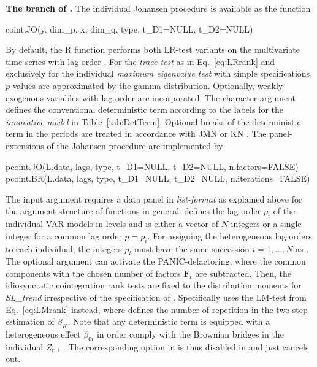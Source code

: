\textbf{The branch of \citeauthor{Johansen1996}.} The individual Johansen procedure is available as the function
\begin{CodeChunk}
\begin{CodeInput}
coint.JO(y, dim_p, x, dim_q, type, t_D1=NULL, t_D2=NULL)
\end{CodeInput}
\end{CodeChunk}
By default, the \textsf{R} function performs both LR-test variants on the  multivariate time series  with lag order . For the \textit{trace test} as in Eq.~\eqref{eq:LRrank} and exclusively for the individual \textit{maximum eigenvalue test} with simple specifications, $p$-values are approximated by the gamma distribution. Optionally, weakly exogenous variables  with lag order  are incorporated. The character argument  defines the conventional deterministic term according to the labels for the \textit{innovative model} in Table~\ref{tab:DetTerm}. Optional breaks of the deterministic term in the periods  are treated in accordance with JMN \citeyearpar{JohansenEtAl2000} or KN \citeyearpar{KuritaNielsen2019}. The panel-extensions of the Johansen procedure are implemented by
\begin{CodeChunk}
\begin{CodeInput}
pcoint.JO(L.data, lags, type, t_D1=NULL, t_D2=NULL, n.factors=FALSE)
pcoint.BR(L.data, lags, type, t_D1=NULL, t_D2=NULL, n.iterations=FALSE)
\end{CodeInput}
\end{CodeChunk}
The input argument  requires a data panel in \textit{list-format} as explained above for the argument structure of  functions in general.  defines the lag order $ p_i $ of the individual VAR models in levels and is either a vector of $ N $ integers or a single integer for a common lag order $ p=p_i $. For assigning the heterogeneous lag orders to each individual, the integers $ p_i $ must have the same succession  $ i = 1, \ldots , N $ as . The optional argument  can activate the PANIC-defactoring, where the common components with the chosen number of factors $ \boldsymbol{F}_t $ are subtracted. Then, the idiosyncratic cointegration rank tests are fixed to the distribution moments for \textit{SL\_trend} irrespective of the specification of . Specifically  uses the LM-test from Eq.~\eqref{eq:LMrank} instead, where  defines the number of repetition in the two-step estimation of $ \beta_{K} $. Note that any deterministic term is equipped with a heterogeneous effect $ \beta_{0i} $ in order comply with the Brownian bridges in the individual $ Z_{r\perp} $. The corresponding option  in  is thus disabled in   and just cancels out.



